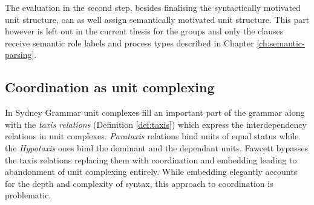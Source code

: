The evaluation in the second step, besides finalising the syntactically motivated unit structure, can as well assign semantically motivated unit structure. This part however is left out in the current thesis for the groups and only the clauses receive semantic role labels and process types described in Chapter \ref{ch:semantic-parsing}.





\subsection{Coordination as unit complexing} %
\label{sec:coordination}

In Sydney Grammar unit complexes fill an important part of the grammar along with the \textit{taxis relations} (Definition \ref{def:taxis}) which express the interdependency relations in unit complexes. \textit{Parataxis} relations bind units of equal status while the \textit{Hypotaxis} ones bind the dominant and the dependant units. Fawcett bypasses the taxis relations replacing them with coordination and embedding \citep[271]{Fawcett2000} leading to abandonment of unit complexing entirely. While embedding elegantly accounts for the depth and complexity of syntax, this approach to coordination is problematic.

